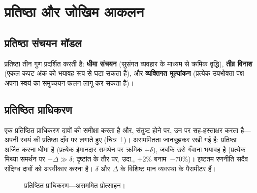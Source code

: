 \documentclass[11pt,a4paper,twocolumn]{article}
\begin{document}
\section{प्रतिष्ठा और जोखिम आकलन}

\subsection{प्रतिष्ठा संचयन मॉडल}

प्रतिष्ठा तीन गुण प्रदर्शित करती है: \textbf{धीमा संचयन} (सुसंगत व्यवहार के माध्यम से क्रमिक वृद्धि), \textbf{तीव्र विनाश} (एकल कपट अंक को भयावह रूप से घटा सकता है), और \textbf{व्यक्तिगत मूल्यांकन} (प्रत्येक उपभोक्ता पक्ष अपना स्वयं का समुच्चयन फलन लागू कर सकता है)।

\subsection{प्रतिष्ठित प्राधिकरण}

एक प्रतिष्ठित प्राधिकरण दावों की समीक्षा करता है और, संतुष्ट होने पर, उन पर सह-हस्ताक्षर करता है---अपनी स्वयं की प्रतिष्ठा दाँव पर लगाते हुए (चित्र~\ref{fig:authority})। असममितता जानबूझकर रखी गई है: प्रतिष्ठा अर्जित करना धीमा है (प्रत्येक ईमानदार समर्थन पर क्रमिक $+\delta$), जबकि उसे गँवाना भयावह है (प्रत्येक मिथ्या समर्थन पर $-\Delta \gg \delta$; दृष्टांत के तौर पर, उदा., $+2\%$ बनाम\ $-70\%$)। इष्टतम रणनीति सदैव संदिग्ध दावों को अस्वीकार करना है। $\delta$ और $\Delta$ के विशिष्ट मान व्यवस्था के पैरामीटर हैं।

\begin{figure}[ht]
\centering
{}
\caption{प्रतिष्ठित प्राधिकरण---असममित प्रोत्साहन।}
\label{fig:authority}
\end{figure}
\end{document}
